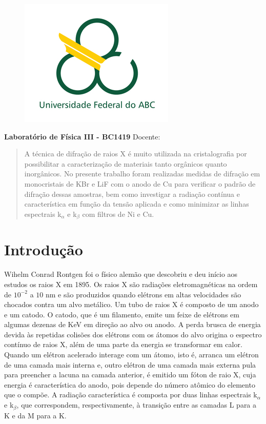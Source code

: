 \documentclass[article,12pt,openright,oneside,a4paper,brazil]{abntex2}
\date{Abril de 2019}
\renewcommand{\imprimircapa}{%
\begin{capa}%
	\begin{figure}[ht]
		\centering
		\includegraphics[scale=0.6]{logo.jpg}
		\label{fig:logo}
	\end{figure}
	\begin{center}
		\textbf{\large Laboratório de Física III - BC1419}
		\vfill
    	{\LARGE\textbf{\imprimirtitulo}}
    	\vfill
    	Docente: \imprimirorientador
    	\vspace*{1cm}
		\imprimirautor
		\vfill
    	\imprimirlocal \\
    	\imprimirdata
	\end{center}
\end{capa}
}
\begin{document}
\begin{KeepFromToc}
\imprimircapa
\tableofcontents
\end{KeepFromToc}
\newpage
\begin{abstract}
    A técnica de difração de raios X é muito utilizada na cristalografia por possibilitar a caracterização de materiais tanto orgânicos quanto inorgânicos. No presente trabalho foram realizadas medidas de difração em monocristais de KBr e LiF com o anodo de Cu para verificar o padrão de difração dessas amostras, bem como investigar a radiação contínua e característica em função da tensão aplicada e como minimizar as linhas espectrais k$_\alpha$ e k$_\beta$ com filtros de Ni e Cu.
\end{abstract}

\newpage
{}
\section{Introdução}\textual

Wihelm Conrad Rontgen foi o físico alemão que descobriu e deu início aos estudos os raios X em 1895. Os raios X são radiações eletromagnéticas na ordem de $10^{-2}$ a $10$ nm e são produzidos quando elétrons em altas velocidades são chocados contra um alvo metálico. Um tubo de raios X é composto de um anodo e um catodo. O catodo, que é um filamento, emite um feixe de elétrons em algumas dezenas de KeV em direção ao alvo ou anodo. A perda brusca de energia devida às repetidas colisões dos elétrons com os átomos do alvo origina o espectro contínuo de raios X, além de uma parte da energia se transformar em calor. Quando um elétron acelerado interage com um átomo, isto é, arranca um elétron de uma camada mais interna e, outro elétron de uma camada mais externa pula para preencher a lacuna na camada anterior, é emitido um fóton de raio X, cuja energia é característica do anodo, pois depende do número atômico do elemento que o compõe. A radiação característica é composta por duas linhas espectrais k$_\alpha$ e k$_\beta$, que correspondem, respectivamente, à transição entre as camadas L para a K e da M para a K.
 
\end{document}
